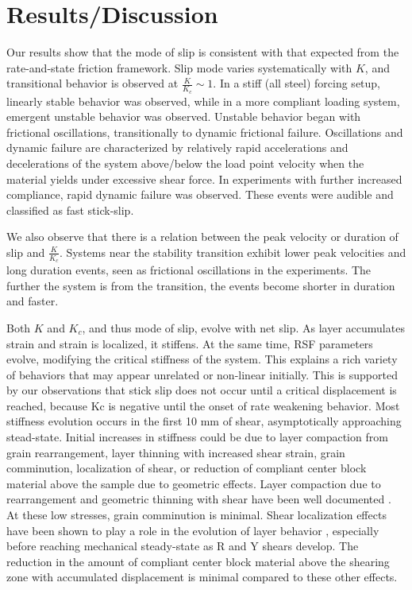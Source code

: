 \documentclass[11pt]{article}
\begin{document}
\section{Results/Discussion}

Our results show that the mode of slip is consistent with that expected from the
rate-and-state friction framework. Slip mode varies systematically with $K$,
and transitional behavior is observed at $\frac{K}{K_c} \sim 1$. In a stiff (all
steel) forcing setup, linearly stable behavior was observed, while in a
more compliant loading system, emergent unstable behavior was observed. Unstable
behavior began with frictional oscillations, transitionally to dynamic frictional
failure. Oscillations and dynamic failure are characterized by relatively rapid
accelerations and decelerations of the system above/below the load point
velocity when the material yields under excessive shear force. In experiments with
further increased compliance, rapid dynamic failure was observed. These events
were audible and classified as fast stick-slip.

We also observe that there is a relation between the peak velocity or duration
of slip and $\frac{K}{K_c}$. Systems near the stability transition exhibit
lower peak velocities and long duration events, seen as frictional oscillations
in the experiments. The further the system is from the transition, the events
become shorter in duration and faster.

Both $K$ and $K_c$, and thus mode of slip, evolve with net slip. As layer
accumulates strain and strain is localized, it stiffens. At the same time, RSF
parameters evolve, modifying the critical stiffness of the system. This explains
a rich variety of behaviors that may appear unrelated or non-linear initially.
This is supported by our observations that stick slip does not occur until a
critical displacement is reached, because Kc is negative until the onset of rate
weakening behavior. Most stiffness evolution occurs in the first 10 mm of shear,
asymptotically approaching stead-state. Initial increases in stiffness could be
due to layer compaction from grain rearrangement, layer thinning with increased
shear strain, grain comminution, localization of shear, or reduction of
compliant center block material above the sample due to geometric effects. Layer
compaction due to rearrangement and geometric thinning with shear have been well
documented \cite{Scott:1994}.  At these low stresses, grain comminution is
minimal. Shear localization effects have been shown to play a role in the
evolution of layer behavior \cite{Logan:1992}, especially before reaching
mechanical steady-state as R and Y shears develop. The reduction in the amount
of compliant center block material above the shearing zone with accumulated
displacement is minimal compared to these other effects.
\end{document}
